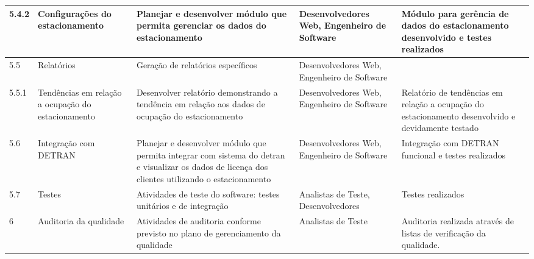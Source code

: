 \begin{landscape}
\begin{longtable}{@{\extracolsep{\fill}}  l  p{}  p{}  p{}  p{}  }
		\midrule
		5.4.2       & Configurações do estacionamento                        & Planejar e desenvolver módulo que permita gerenciar os dados do estacionamento                                                                                                  & Desenvolvedores Web, Engenheiro de Software                                                      & Módulo para gerência de dados do estacionamento desenvolvido e testes realizados                       \\*
		\midrule
		5.5         & Relatórios                                              & Geração de relatórios específicos                                                                                                                                            & Desenvolvedores Web, Engenheiro de Software                                                      &                                                                                                          \\*
		\midrule
		5.5.1       & Tendências em relação a ocupação do estacionamento  & Desenvolver relatório demonstrando a tendência em relação aos dados de ocupação do estacionamento                                                                          & Desenvolvedores Web, Engenheiro de Software                                                      & Relatório de tendências em relação a ocupação do estacionamento desenvolvido e devidamente testado \\*
		\midrule
		5.6         & Integração com DETRAN                                  & Planejar e desenvolver módulo que permita integrar com sistema do detran e visualizar os dados de licença dos clientes utilizando o estacionamento                             & Desenvolvedores Web, Engenheiro de Software                                                      & Integração com DETRAN funcional e testes realizados                                                    \\*
		\midrule
		5.7         & Testes                                                   & Atividades de teste do software: testes unitários e de integração                                                                                                             & Analistas de Teste, Desenvolvedores                                                              & Testes realizados                                                                                        \\*
		\midrule
		6           & Auditoria da qualidade                                                & Atividades de auditoria conforme previsto no plano de gerenciamento da qualidade                                                                                                 & Analistas de Teste                                                                               & Auditoria realizada através de listas de verificação da qualidade.                                    \\*

\end{longtable}
\end{landscape}
